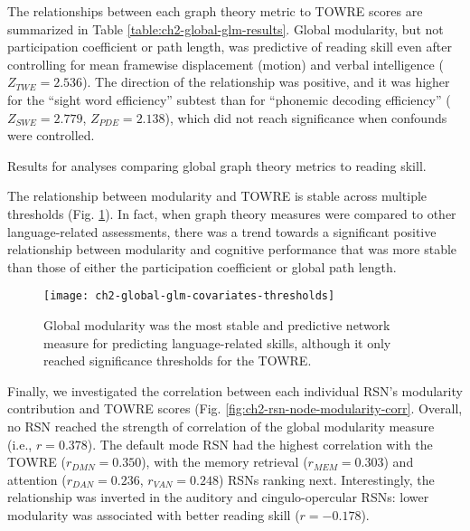 The relationships between each graph theory metric to TOWRE scores are summarized in Table \ref{table:ch2-global-glm-results}. Global modularity, but not participation coefficient or path length, was predictive of reading skill even after controlling for mean framewise displacement (motion) and verbal intelligence ($Z_{TWE} = 2.536$). The direction of the relationship was positive, and it was higher for the ``sight word efficiency'' subtest than for ``phonemic decoding efficiency'' ($Z_{SWE} = 2.779$, $Z_{PDE} = 2.138$), which did not reach significance when confounds were controlled. 

\begin{table}[t]
    \renewcommand{\tabcolsep}{0.09cm}
    \centering
    
    \caption[Results for analyses comparing global graph theory metrics to reading skill.]{Results for analyses comparing global graph theory metrics to reading skill.}
    \label{table:ch2-global-glm-results}
\end{table}

The relationship between modularity and TOWRE is stable across multiple thresholds (Fig. \ref{fig:ch2-global-glm-covariates-thresh}). In fact, when graph theory measures were compared to other language-related assessments, there was a trend towards a significant positive relationship between modularity and cognitive performance that was more stable than those of either the participation coefficient or global path length. 

\begin{figure}[t]
    \centering
    \texttt{[image: ch2-global-glm-covariates-thresholds]}
    \caption[Modularity metrics at rest are the best predictors of cognitive skills.] {Global modularity was the most stable and predictive network measure for predicting language-related skills, although it only reached significance thresholds for the TOWRE.}
    \label{fig:ch2-global-glm-covariates-thresh}
\end{figure}

Finally, we investigated the correlation between each individual RSN's modularity contribution and TOWRE scores (Fig. \ref{fig:ch2-rsn-node-modularity-corr}. Overall, no RSN reached the strength of correlation of the global modularity measure (i.e., $r = 0.378$). The default mode RSN had the highest correlation with the TOWRE ($r_{DMN} = 0.350$), with the memory retrieval ($r_{MEM} = 0.303$) and attention ($r_{DAN} = 0.236$, $r_{VAN} = 0.248$) RSNs ranking next. Interestingly, the relationship was inverted in the auditory and cingulo-opercular RSNs: lower modularity was associated with better reading skill ($r = -0.178$).

